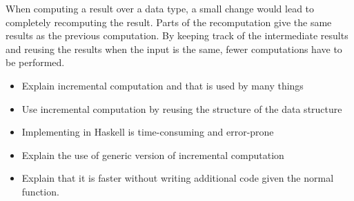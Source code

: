 
When computing a result over a data type, a small change would lead to completely recomputing the result. Parts of the recomputation give the same results as the previous computation. By keeping track of the intermediate results and reusing the results when the input is the same, fewer computations have to be performed. 

\begin{itemize}
  \item Explain incremental computation and that is used by many things
  \item Use incremental computation by reusing the structure of the data structure
  \item Implementing in Haskell is time-consuming and error-prone
  \item Explain the use of generic version of incremental computation
  \item Explain that it is faster without writing additional code given the normal function.
\end{itemize}